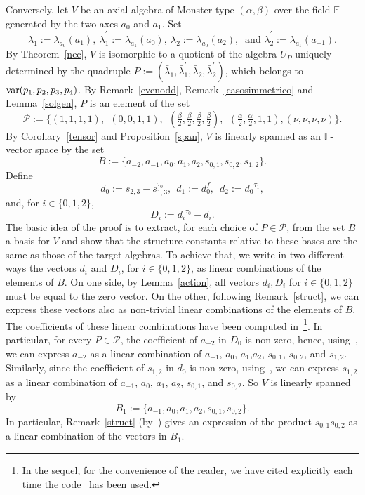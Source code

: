 \documentclass[a4paper]{amsart}
\newcommand{\Var}{{\rm var}}
\newcommand{\F}{{\mathbb F}}
\newcommand{\al}{\alpha}
\newcommand{\bt}{\beta}
\begin{document}
Conversely, let $V$ be an axial algebra of Monster type $(\al, \bt)$ over the field $\F$ generated by the two axes $a_0$ and $a_1$. Set
 $$
\bar \lambda_1:=\lambda_{a_0}(a_1), \:  \bar \lambda_1^\prime:=\lambda_{a_1}(a_0), \:
 \bar \lambda_2:=\lambda_{a_0}(a_2), \:\mbox{ and } \bar \lambda_2^\prime:=\lambda_{a_1}(a_{-1}). 
 $$
By Theorem~\ref{nec}, $V$ is isomorphic to a quotient of the algebra $U_P$ uniquely determined by the quadruple $P:= (\bar \lambda_1, \bar \lambda_1^\prime, \bar \lambda_2,  \bar \lambda_2^\prime)$, which belongs to $\mathcal \Var(p_1, p_2, p_3, p_4)$. By Remark~\ref{evenodd}, Remark~\ref{casosimmetrico} and Lemma~\ref{solgen}, $P$ is an element of the set
$$
\mathcal P:=\{(1,1,1,1),\:\: (0,0,1,1), \:\:(\tfrac{\bt}{2}, \tfrac{\bt}{2}, \tfrac{\bt}{2}, \tfrac{\bt}{2} ),\:\: (\tfrac{\al}{2}, \tfrac{\al}{2}, 1,1  ), (\nu, \nu, \nu, \nu)\}.
$$
By Corollary~\ref{tensor} and Proposition~\ref{span}, $V$ is linearly spanned as an $\F$-vector space by the set 
$$B:=\{a_{-2}, a_{-1}, a_{0}, a_{1}, a_{2}, s_{0,1}, s_{0,2}, s_{1,2}\}.
$$
 Define
$$
d_0:=s_{2,3}-s_{1,3}^{\tau_0}, \:\:
d_1:=d_0^f, \:\;   
d_2:={d_0}^{\tau_1},
$$
and, for $ i\in \{0,1,2\}$,
$$ 
D_i:={d_i}^{\tau_0}-d_i. 
$$
The basic idea of the proof is to extract, for each choice of  $P\in \mathcal P$, from the set $B$ a basis for $V$ and show that the structure constants relative to these bases  are the same as those of the target algebras. To achieve that, we write in two different ways the vectors $d_i$ and $D_i$, for $i\in \{0,1,2\}$, as linear combinations of the elements of $B$. 
On one side, by Lemma~\ref{action}, all vectors  $d_i, D_i$ for $i\in \{0,1,2\}$ must be equal to the zero vector. On the other, following Remark~\ref{struct}, we can express these vectors also as non-trivial linear combinations of the elements of $B$. The coefficients of these linear combinations have been computed in~\cite[genericsakuma.s]{code}\footnote{In the sequel, for the convenience of the reader, we have cited explicitly each time the code~\cite[genericsakuma.s]{code} has been used.}. In particular, for every $P\in \mathcal P$, the coefficient of $a_{-2}$ in $D_0$ is non zero, hence, using~\cite[genericsakuma.s]{code}, we can express $a_{-2}$ as a linear combination of $a_{-1}$, $a_{0}$, $a_{1}$,$a_{2}$, $s_{0,1}$, $s_{0,2}$, and $s_{1,2}$. Similarly, since the coefficient of $s_{1,2}$ in $d_0$ is non zero, using~\cite[genericsakuma.s]{code}, we can express $s_{1,2}$ as a linear combination of $a_{-1}$, $a_{0}$, $a_{1}$, $a_{2}$, $s_{0,1}$, and $s_{0,2}$. So $V$ is linearly spanned by 
$$
B_1:=\{a_{-1}, a_{0}, a_{1}, a_{2}, s_{0,1}, s_{0,2}\}.
$$
In particular, Remark~\ref{struct} (by~\cite[genericsakuma.s]{code}) gives an expression of the product $s_{0,1}s_{0,2}$ as a linear combination of the vectors in $B_1$.
\end{document}
